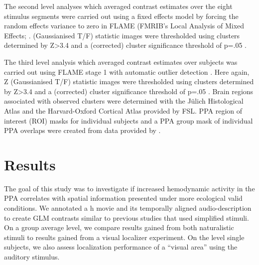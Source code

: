 \documentclass[english]{article}
\begin{document}
The second level analyses which averaged contrast estimates over the eight
stimulus segments were carried out using a fixed effects model by forcing the
random effects variance to zero in FLAME (FMRIB's Local Analysis of Mixed
Effects; \citep{beckmann2003general, woolrich2004multilevel}.
(Gaussianised T/F) statistic images were thresholded using clusters determined
by Z>3.4 and a (corrected) cluster significance threshold of p=.05
\citep{worsley2001statistical}.

The third level analysis which averaged contrast estimates over subjects was
carried out using FLAME stage 1 with automatic outlier detection
\citep{beckmann2003general, woolrich2004multilevel, woolrich2008robust}.
Here again, Z (Gaussianised T/F) statistic images were thresholded using
clusters determined by Z>3.4 and a (corrected) cluster significance threshold of
p=.05 \citep{worsley2001statistical}.
Brain regions associated with observed clusters were determined with the Jülich
Histological Atlas \citep{eickhoff2005toolbox, eickhoff2007assignment} and the
Harvard-Oxford Cortical Atlas \citep{desikan2006automated} provided by FSL.
PPA region of interest (ROI) masks for individual subjects and a PPA group mask
of individual PPA overlaps were created from data provided by
\citep{sengupta2016extension}.


\section{Results}

The goal of this study was to investigate if increased hemodynamic activity in
the PPA correlates with spatial information presented under more ecological
valid conditions.
We annotated a \unit[2]{h} movie and its temporally aligned audio-description to
create GLM contrasts similar to previous studies that used simplified stimuli.
On a group average level, we compare results gained from both naturalistic
stimuli to results gained from a visual localizer experiment.
On the level single subjects, we also assess localization performance of a
``visual area'' using the auditory stimulus.

\end{document}
